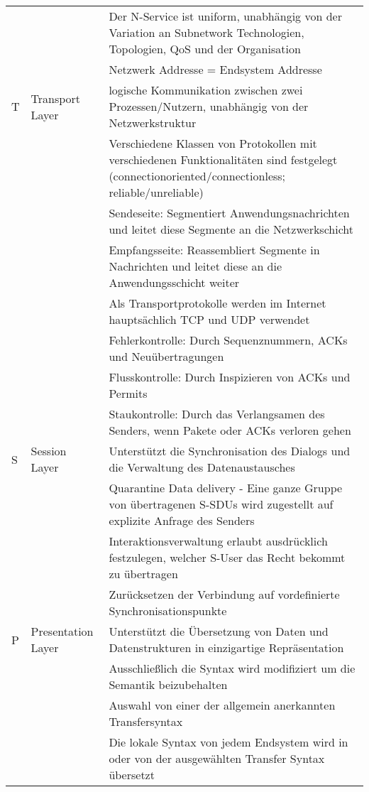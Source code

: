 \documentclass[10pt,landscape]{article}
\begin{document}
\begin{tabular}{l | l | l}
        &&Der N-Service ist uniform, unabhängig von der Variation an Subnetwork Technologien, Topologien, QoS und der Organisation\\
        &&Netzwerk Addresse = Endsystem Addresse\\
        \hline
    T & Transport Layer & 
    logische Kommunikation zwischen zwei Prozessen/Nutzern, unabhängig von der Netzwerkstruktur\\
        &&Verschiedene Klassen von Protokollen mit verschiedenen Funktionalitäten sind festgelegt (connectionoriented/connectionless; reliable/unreliable)\\
        && Sendeseite: Segmentiert Anwendungsnachrichten und leitet diese Segmente an die Netzwerkschicht \\
        && Empfangsseite: Reassembliert Segmente in Nachrichten und leitet diese an die Anwendungsschicht weiter \\
        && Als Transportprotokolle werden im Internet hauptsächlich TCP und UDP verwendet \\
        && Fehlerkontrolle: Durch Sequenznummern, ACKs und Neuübertragungen\\
        && Flusskontrolle: Durch Inspizieren von ACKs und Permits\\
        && Staukontrolle: Durch das Verlangsamen des Senders, wenn Pakete oder ACKs verloren gehen\\
        \hline
    S & Session Layer &
        Unterstützt die Synchronisation des Dialogs und die Verwaltung des Datenaustausches\\
        &&Quarantine Data delivery - Eine ganze Gruppe von übertragenen S-SDUs wird zugestellt auf explizite Anfrage des Senders\\
        &&Interaktionsverwaltung erlaubt ausdrücklich festzulegen, welcher S-User das Recht bekommt zu übertragen\\
        &&Zurücksetzen der Verbindung auf vordefinierte Synchronisationspunkte\\
        \hline
    P & Presentation Layer &
        Unterstützt die Übersetzung von Daten und Datenstrukturen in einzigartige Repräsentation\\
        &&Ausschließlich die Syntax wird modifiziert um die Semantik beizubehalten\\
        &&Auswahl von einer der allgemein anerkannten Transfersyntax\\
        &&Die lokale Syntax von jedem Endsystem wird in oder von der ausgewählten Transfer Syntax übersetzt\\

\end{tabular}
\end{document}
